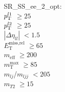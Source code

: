 SR\_SS\_ee\_2\_opt: \\
$p_{\text{T}}^{l1}$ $\geq 25$ \\
$p_{\text{T}}^{l2}$ $\geq 25$ \\
$|\Delta\eta_{ll}|$ $<1.5$ \\
$E_{\text{T}}^{\text{miss,rel}}$ $\geq 65$ \\
$m_{\text{eff}}$ $\geq 200$ \\
$m_{\text{T}}^{\text{max}}$ $\geq 85$ \\
$m_{lj}$/$m_{ljj}$ $<205$ \\
$m_{T2}$ $\geq 15$ \\
